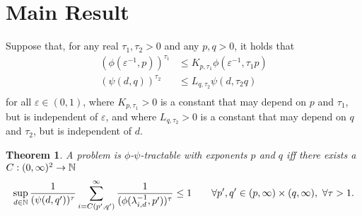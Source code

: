 \documentclass{article}
\newtheorem{theorem}{Theorem}
\theoremstyle{definition}
\begin{document}
\section{Main Result}
Suppose that, for any real $\tau_1, \tau_2>0$ and any $p,q>0$, it holds that
\begin{align*}
 (\phi(\varepsilon^{-1},p))^{\tau_1} &\le K_{p,\tau_1} \phi (\varepsilon^{-1},\tau_1 p)\\
  (\psi(d,q))^{\tau_2} &\le L_{q,\tau_2} \psi (d,\tau_2 q)\\
\end{align*}
for all $\varepsilon\in (0,1)$, where $K_{p,\tau_1}>0$ is a constant that may depend on $p$ and $\tau_1$, but is independent of $\varepsilon$, and where $L_{q,\tau_2}>0$ is a constant that may depend on $q$ and $\tau_2$, but is independent of $d$.
\begin{theorem}\label{thm_main} 
A problem is $\phi$-$\psi$-tractable with exponents $p$ and $q$ iff there exists a  $C : (0,\infty)^2 \to \mathbb{N}$
\begin{equation} \label{eq:tractiff}
     \sup_{d \in \mathbb{N}} \frac{1}{(\psi(d,q'))^\tau} \sum_{i = C(p',q')}^\infty \frac{1}{(\phi(\lambda_{i, d}^{-1},p'))^\tau} \le 1 \qquad \forall p',q' \in (p,\infty)\times (q,\infty),\ \forall \tau>1.
\end{equation}
\end{theorem}
\end{document}
